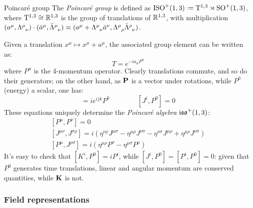 \begin{definition}{Poincaré group}{}
  The \textit{Poincaré group} is defined as $ \pog \defeq \mathrm{T}^{1,3} \rtimes \lorg $, where $ \mathrm{T}^{1,3} \cong \mathbb{R}^{1,3} $ is the group of translations of $ \mathbb{R}^{1,3} $, with multiplication $ (a^\mu, \tensor{\Lambda}{^\mu_\nu}) \cdot (\bar{a}^\mu, \tensor{\bar{\Lambda}}{^\mu_\nu}) \equiv (a^\mu + \tensor{\Lambda}{^\mu_\nu} \bar{a}^\nu, \tensor{\Lambda}{^\mu_\rho} \tensor{\bar{\Lambda}}{^\rho_\nu}) $.
\end{definition}

Given a translation $ x^\mu \mapsto x^\mu + a^\mu $, the associated group element can be written as:
\begin{equation}
  T = e^{-i a_\mu P^\mu}
\end{equation}
where $ P^\mu $ is the 4-momentum operator. Clearly translations commute, and so do their generators; on the other hand, as $ \mathbf{P} $ is a vector under rotations, while $ P^0 $ (energy) a scalar, one has:
\begin{equation*}
  [J^i,P^j] = i e^{ijk} P^k
  \qquad \qquad
  [J^i,P^0] = 0
\end{equation*}
These equations uniquely determine the \textit{Poincaré algebra} $ \mathfrak{iso}^+(1,3) $:
\begin{equation}
  \begin{gathered}
    [P^\mu,P^\nu] = 0 \\
    [J^{\mu \nu}, J^{\sigma \rho}] = i \left( \eta^{\nu \rho} J^{\mu \sigma} - \eta^{\mu \rho} J^{\nu \sigma} - \eta^{\nu \sigma} J^{\mu \rho} + \eta^{\mu \rho} J^{\nu \sigma} \right) \\
    [P^\mu,J^{\rho \sigma}] = i \left( \eta^{\mu \rho} P^\sigma - \eta^{\mu \sigma} P^\rho \right)
  \end{gathered}
\end{equation}
It's easy to check that $ [K^i,P^0] = i P^i $, while $ [J^i,P^0] = [P^i,P^0] = 0 $: given that $ P^0 $ generates time translations, linear and angular momentum are conserved quantities, while $ \mathbf{K} $ is not.

\subsubsection{Field representations}

